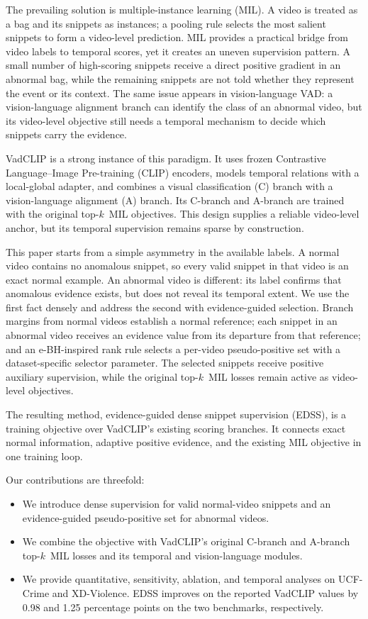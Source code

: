 \documentclass[preprint,12pt]{elsarticle}
\newcommand{\topk}{top-$k$\ }
\begin{document}
The prevailing solution is multiple-instance learning (MIL). A video is treated as a bag and its snippets as instances; a pooling rule selects the most salient snippets to form a video-level prediction. MIL provides a practical bridge from video labels to temporal scores, yet it creates an uneven supervision pattern. A small number of high-scoring snippets receive a direct positive gradient in an abnormal bag, while the remaining snippets are not told whether they represent the event or its context. The same issue appears in vision-language VAD: a vision-language alignment branch can identify the class of an abnormal video, but its video-level objective still needs a temporal mechanism to decide which snippets carry the evidence.

VadCLIP \citep{vadclip2024} is a strong instance of this paradigm. It uses frozen Contrastive Language--Image Pre-training (CLIP) encoders, models temporal relations with a local-global adapter, and combines a visual classification (C) branch with a vision-language alignment (A) branch. Its C-branch and A-branch are trained with the original \topk MIL objectives. This design supplies a reliable video-level anchor, but its temporal supervision remains sparse by construction.

This paper starts from a simple asymmetry in the available labels. A normal video contains no anomalous snippet, so every valid snippet in that video is an exact normal example. An abnormal video is different: its label confirms that anomalous evidence exists, but does not reveal its temporal extent. We use the first fact densely and address the second with evidence-guided selection. Branch margins from normal videos establish a normal reference; each snippet in an abnormal video receives an evidence value from its departure from that reference; and an e-BH-inspired rank rule selects a per-video pseudo-positive set with a dataset-specific selector parameter. The selected snippets receive positive auxiliary supervision, while the original \topk MIL losses remain active as video-level objectives.

The resulting method, evidence-guided dense snippet supervision (EDSS), is a training objective over VadCLIP's existing scoring branches. It connects exact normal information, adaptive positive evidence, and the existing MIL objective in one training loop.

Our contributions are threefold:
\begin{itemize}
    \item We introduce dense supervision for valid normal-video snippets and an evidence-guided pseudo-positive set for abnormal videos.
    \item We combine the objective with VadCLIP's original C-branch and A-branch \topk MIL losses and its temporal and vision-language modules.
    \item We provide quantitative, sensitivity, ablation, and temporal analyses on UCF-Crime and XD-Violence. EDSS improves on the reported VadCLIP values by 0.98 and 1.25 percentage points on the two benchmarks, respectively.
\end{itemize}
\end{document}
